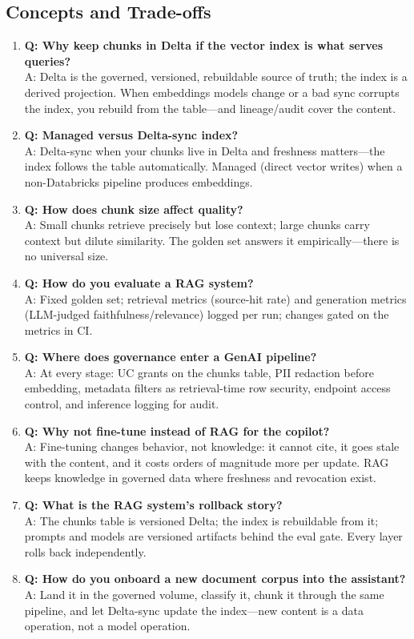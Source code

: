 \subsection{Concepts and Trade-offs}
\begin{enumerate}
    \item \textbf{Q: Why keep chunks in Delta if the vector index is what serves queries?}\\
    A: Delta is the governed, versioned, rebuildable source of truth; the index is a derived projection. When embeddings models change or a bad sync corrupts the index, you rebuild from the table---and lineage/audit cover the content.
    \item \textbf{Q: Managed versus Delta-sync index?}\\
    A: Delta-sync when your chunks live in Delta and freshness matters---the index follows the table automatically. Managed (direct vector writes) when a non-Databricks pipeline produces embeddings.
    \item \textbf{Q: How does chunk size affect quality?}\\
    A: Small chunks retrieve precisely but lose context; large chunks carry context but dilute similarity. The golden set answers it empirically---there is no universal size.
    \item \textbf{Q: How do you evaluate a RAG system?}\\
    A: Fixed golden set; retrieval metrics (source-hit rate) and generation metrics (LLM-judged faithfulness/relevance) logged per run; changes gated on the metrics in CI.
    \item \textbf{Q: Where does governance enter a GenAI pipeline?}\\
    A: At every stage: UC grants on the chunks table, PII redaction before embedding, metadata filters as retrieval-time row security, endpoint access control, and inference logging for audit.
    \item \textbf{Q: Why not fine-tune instead of RAG for the copilot?}\\
    A: Fine-tuning changes behavior, not knowledge: it cannot cite, it goes stale with the content, and it costs orders of magnitude more per update. RAG keeps knowledge in governed data where freshness and revocation exist.
    \item \textbf{Q: What is the RAG system's rollback story?}\\
    A: The chunks table is versioned Delta; the index is rebuildable from it; prompts and models are versioned artifacts behind the eval gate. Every layer rolls back independently.
    \item \textbf{Q: How do you onboard a new document corpus into the assistant?}\\
    A: Land it in the governed volume, classify it, chunk it through the same pipeline, and let Delta-sync update the index---new content is a data operation, not a model operation.
\end{enumerate}

